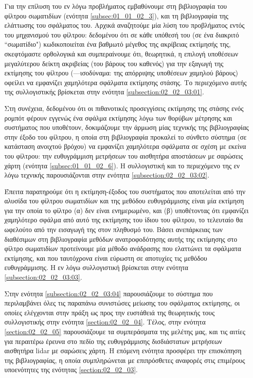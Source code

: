 Για την επίλυση του εν λόγω προβλήματος εμβαθύνουμε στη βιβλιογραφία του
φίλτρου σωματιδίων (ενότητα \ref{subsec:01_01_02_3}), και τη βιβλιογραφία της
ελάττωσης του σφάλματος του. Αρχικά αναζητούμε μία λύση του προβλήματος εντός
του μηχανισμού του φίλτρου: δεδομένου ότι σε κάθε υπόθεσή του (σε ένα διακριτό
``σωματίδιο") κωδικοποιείται ένα βαθμωτό μέγεθος της ακρίβειας εκτίμησής
της, σκεφτόμαστε ορθολογικά και συμπεραίνουμε ότι, θεωρητικά, η επιλογή
υποθέσεων μεγαλύτερου δείκτη ακριβείας (του βάρους του καθενός) για την εξαγωγή
της εκτίμησης του φίλτρου (---ισοδύναμα: της απόρριψης υποθέσεων χαμηλού βάρους)
οφείλει να εμφανίζει χαμηλότερα σφάλματα εκτίμησης στάσης. Το περιεχόμενο αυτής
της συλλογιστικής βρίσκεται στην ενότητα \ref{subsection:02_02_03:01}.

Στη συνέχεια, δεδομένου ότι οι πιθανοτικές προσεγγίσεις εκτίμησης της στάσης
ενός ρομπότ φέρουν εγγενώς ένα σφάλμα εκτίμησης λόγω των θορύβων μέτρησης και
συστήματος που υποθέτουν, δοκιμάζουμε την άρμωση μίας τεχνικής της
βιβλιογραφίας στην έξοδο του φίλτρου, η οποία στη βιβλιογραφία προκαλεί το
σύνθετο σύστημα (σε κατάσταση ανοιχτού βρόχου) να εμφανίζει χαμηλότερα
σφάλματα σε σχέση με εκείνα του φίλτρου: την ευθυγράμμιση μετρήσεων του
αισθητήρα αποστάσεων με σαρώσεις χάρτη (ενότητα \ref{subsec:01_01_02_6}). Η
συλλογιστική και το περιεχόμενο της εν λόγω τεχνικής παρουσιάζονται στην
ενότητα \ref{subsection:02_02_03:02}.

Έπειτα παρατηρούμε ότι η εκτίμηση-έξοδος του συστήματος που αποτελείται από την
αλυσίδα του φίλτρου σωματιδίων και της μεθόδου ευθυγράμμισης είναι μία εκτίμηση
για την οποία το φίλτρο (α) δεν είναι ενημερωμένο, και (β) υποθέτοντας ότι
εμφανίζει χαμηλότερο σφάλμα από αυτό της εκτίμησης του ίδιου του φίλτρου, το
τελευταίο θα ωφελούτο από την εισαγωγή της στον πληθυσμό του. Βάσει ανεπάρκειας
των διαθέσιμων στη βιβλιογραφία μεθόδων ανατροφοδότησης αυτής της εκτίμησης στο
φίλτρο σωματιδίων προτείνουμε μία μέθοδο ανάδρασης που ελαττώνει τα σφάλματα
εκτίμησης, και που ταυτόχρονα είναι εύρωστη σε αποτυχίες τις μεθόδου
ευθυγράμμισης.  Η εν λόγω συλλογιστική βρίσκεται στην ενότητα
\ref{subsection:02_02_03:03}.

Στην ενότητα \ref{subsection:02_02_03:04} παρουσιάζουμε το σύστημα που
περιλαμβάνει όλες τις παραπάνω συνιστώσες μείωσης του σφάλματος εκτίμησης, οι
οποίες ελέγχονται στην πράξη ως προς την ευστάθειά της θεωρητικής τους
συλλογιστικής στην ενότητα \ref{section:02_02_04}. Τέλος, στην ενότητα
\ref{section:02_02_05} παρουσιάζουμε τα συμπεράσματα της μελέτης μας, και τις
αιτίες για περαιτέρω έρευνα στο πεδίο της ευθυγράμμισης δισδιάστατων μετρήσεων
αισθητήρα lidar με σαρώσεις χάρτη. Η επόμενη ενότητα προσφέρει την επισκόπηση
της βιβλιογραφίας, η οποία συμπληρώνεται με επιπρόσθετες αναφορές στις
επιμέρους υποενότητες της ενότητας \ref{section:02_02_03}.
